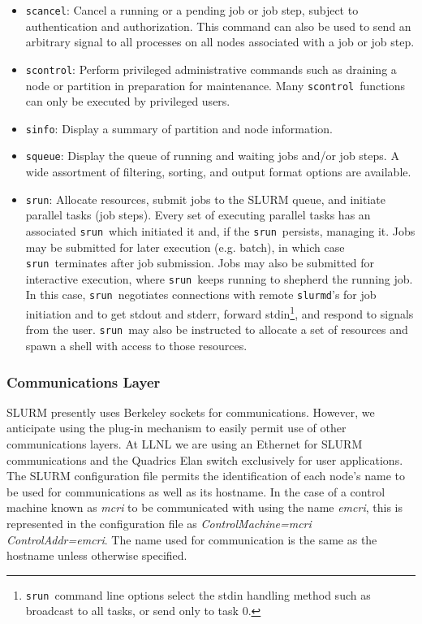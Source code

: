 \documentclass{article}
\newcommand{\srun}{{\tt srun}}
\newcommand{\scontrol}{{\tt scontrol}}
\begin{document}
\begin{itemize}
\item {\tt scancel}: Cancel a running or a pending job or job step, 
subject to authentication and authorization. This command can also 
be used to send an arbitrary signal to all processes on all nodes 
associated with a job or job step.

\item {\tt scontrol}: Perform privileged administrative commands
such as draining a node or partition in preparation for maintenance. 
Many \scontrol\ functions can only be executed by privileged users.

\item {\tt sinfo}: Display a summary of partition and node information.

\item {\tt squeue}: Display the queue of running and waiting jobs 
and/or job steps. A wide assortment of filtering, sorting, and output 
format options are available.

\item {\tt srun}: Allocate resources, submit jobs to the SLURM queue,
and initiate parallel tasks (job steps). 
Every set of executing parallel tasks has an associated \srun\ which 
initiated it and, if the \srun\ persists, managing it. 
Jobs may be submitted for later execution (e.g. batch), in which case 
\srun\ terminates after job submission. 
Jobs may also be submitted for interactive execution, where \srun\ keeps 
running to shepherd the running job. In this case, 
\srun\ negotiates connections with remote {\tt slurmd}'s 
for job initiation and to
get stdout and stderr, forward stdin\footnote{\srun\ command
line options select the stdin handling method such as broadcast to all
tasks, or send only to task 0.}, and respond to signals from the user.
\srun\ may also be instructed to allocate a set of resources and
spawn a shell with access to those resources.

\end{itemize}

\subsubsection{Communications Layer}

SLURM presently uses Berkeley sockets for communications. 
However, we anticipate using the plug-in mechanism to easily 
permit use of other communications layers. 
At LLNL we are using an Ethernet for SLURM communications and 
the Quadrics Elan switch exclusively for user applications. 
The SLURM configuration file permits the identification of each 
node's name to be used for communications as well as its hostname. 
In the case of a control machine known as {\em mcri} to be communicated 
with using the name {\em emcri}, this is represented in the 
configuration file as {\em ControlMachine=mcri ControlAddr=emcri}.
The name used for communication is the same as the hostname unless 
otherwise specified.
\end{document}
